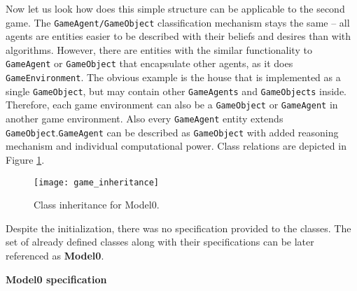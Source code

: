 Now let us look how does this simple structure can be applicable to the second game. The \texttt{GameAgent/GameObject} classification mechanism stays the same -- all agents are entities  easier to be described with their beliefs and desires than with algorithms. However, there are entities with the similar functionality to \texttt{GameAgent} or \texttt{GameObject} that encapsulate other agents, as it does \texttt{GameEnvironment}. The obvious example is the house  that is implemented as a single \texttt{GameObject}, but may contain other \texttt{GameAgents} and \texttt{GameObjects} inside. Therefore, each game environment can also be a \texttt{GameObject} or \texttt{GameAgent} in another game environment. Also every \texttt{GameAgent} entity extends \texttt{GameObject}.\texttt{GameAgent} can be described as \texttt{GameObject} with added reasoning mechanism and individual computational power. Class relations are depicted in Figure \ref{ClassInh}.
 \begin{figure}[h!]
    \begin{center}
      \texttt{[image: game\_inheritance]}
      \caption{Class inheritance for Model0.}
      \label{ClassInh}
     \end{center}
    \end{figure}
Despite the initialization, there was no specification provided to the classes. The set of already defined classes along with their specifications can be later referenced as \textbf{Model0}.
\begin{center}
    \textbf{Model0 specification}
\end{center}
